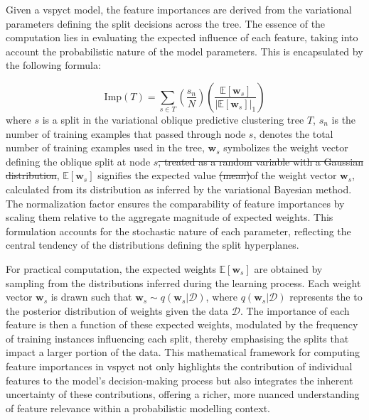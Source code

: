\documentclass[3p,review,authoryear]{elsarticle}
\newcommand{\mpop}[2]{{\color{orange}\sout{#1}\color{purple}{#2}}}
\begin{document}
Given a \gls{vspyct} model, the feature importances are derived from the variational parameters defining the split decisions across the tree.
The essence of the computation lies in evaluating the expected influence of each feature, taking into account the probabilistic nature of the model parameters.
This is encapsulated by the following formula:

\begin{equation}
\text{Imp}(T) = \sum_{s \in T} \left( \frac{s_n}{N} \right) \left( \frac{\mathbb{E}[\mathbf{w}_s]}{|\mathbb{E}[\mathbf{w}_s]|_1} \right)
\end{equation}
where $s$ is a split in the variational oblique predictive clustering tree $T$, $s_n$ is the number of training examples that passed through node $s$,  denotes the total number of training examples used in the tree, $\mathbf{w}_s$ symbolizes the weight vector defining the oblique split at node $s$\mpop{, treated as a random variable with a Gaussian distribution}{}, $\mathbb{E}[\mathbf{w}_s]$ signifies the expected value \mpop{(mean)}{ }of the weight vector $\mathbf{w}_s$, calculated from its  distribution as inferred by the variational Bayesian method.
The normalization factor  ensures the comparability of feature importances by scaling them relative to the aggregate magnitude of expected weights.
This formulation accounts for the stochastic nature of each parameter, reflecting the central tendency of the distributions defining the split hyperplanes.

For practical computation, the expected weights $\mathbb{E}[\mathbf{w}_s]$ are obtained by sampling from the  distributions inferred during the learning process.
Each weight vector $\mathbf{w}_s$ is drawn such that $\mathbf{w}_s \sim q(\mathbf{w}_s|\mathcal{D})$, where $q(\mathbf{w}_s|\mathcal{D})$ represents the  to the posterior distribution of weights given the data $\mathcal{D}$.
The importance of each feature is then a function of these expected weights, modulated by the frequency of training instances influencing each split, thereby emphasising the splits that impact a larger portion of the data.
This mathematical framework for computing feature importances in \gls{vspyct} not only highlights the contribution of individual features to the model's decision-making process but also integrates the inherent uncertainty of these contributions, offering a richer, more nuanced understanding of feature relevance within a probabilistic modelling context.
\end{document}
